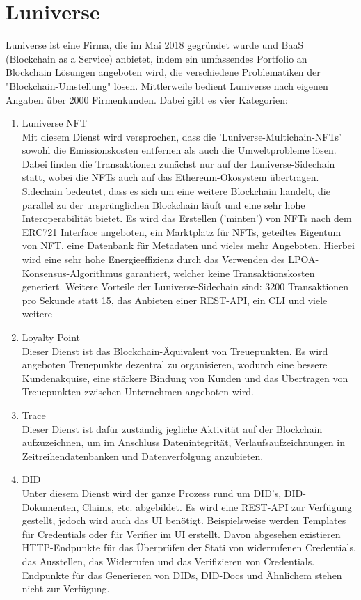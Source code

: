 \section{Luniverse}
Luniverse \cite{ID27} ist eine Firma, die im Mai 2018 gegründet wurde und BaaS (Blockchain as a Service) anbietet, indem ein umfassendes Portfolio an Blockchain Lösungen angeboten wird, die verschiedene Problematiken der "Blockchain-Umstellung" lösen. Mittlerweile bedient Luniverse nach eigenen Angaben über 2000 Firmenkunden. Dabei gibt es vier Kategorien:

\begin{enumerate}
	\item Luniverse NFT \\
	Mit diesem Dienst wird versprochen, dass die 'Luniverse-Multichain-NFTs' sowohl die Emissionskosten entfernen als auch die Umweltprobleme lösen. Dabei finden die Transaktionen zunächst nur auf der Luniverse-Sidechain statt, wobei die NFTs auch auf das Ethereum-Ökosystem übertragen. Sidechain bedeutet, dass es sich um eine weitere Blockchain handelt, die parallel zu der ursprünglichen Blockchain läuft und eine sehr hohe Interoperabilität bietet. 
	Es wird das Erstellen ('minten') von NFTs nach dem ERC721 Interface angeboten, ein Marktplatz für NFTs, geteiltes Eigentum von NFT, eine Datenbank für Metadaten und vieles mehr Angeboten. Hierbei wird eine sehr hohe Energieeffizienz durch das Verwenden des LPOA-Konsensus-Algorithmus garantiert, welcher keine Transaktionskosten generiert.
	Weitere Vorteile der Luniverse-Sidechain sind: 3200 Transaktionen pro Sekunde statt 15, das Anbieten einer REST-API, ein CLI und viele weitere
	
	\item Loyalty Point \\
	Dieser Dienst ist das Blockchain-Äquivalent von Treuepunkten. Es wird angeboten Treuepunkte dezentral zu organisieren, wodurch eine bessere Kundenakquise, eine stärkere Bindung von Kunden und das Übertragen von Treuepunkten zwischen Unternehmen angeboten wird.
	
	\item Trace \\
	Dieser Dienst ist dafür zuständig jegliche Aktivität auf der Blockchain aufzuzeichnen, um im Anschluss Datenintegrität, Verlaufsaufzeichnungen in Zeitreihendatenbanken und Datenverfolgung anzubieten.
	
	
	\item DID \\
	Unter diesem Dienst wird der ganze Prozess rund um DID's, DID-Dokumenten, Claims, etc. abgebildet. Es wird eine REST-API zur Verfügung gestellt, jedoch wird auch das UI benötigt. Beispielsweise werden Templates für Credentials oder für Verifier im UI erstellt.
	Davon abgesehen existieren HTTP-Endpunkte für das Überprüfen der Stati von widerrufenen Credentials, das Ausstellen, das Widerrufen und das Verifizieren von Credentials. Endpunkte für das Generieren von DIDs, DID-Docs und Ähnlichem stehen nicht zur Verfügung.
	
\end{enumerate}

